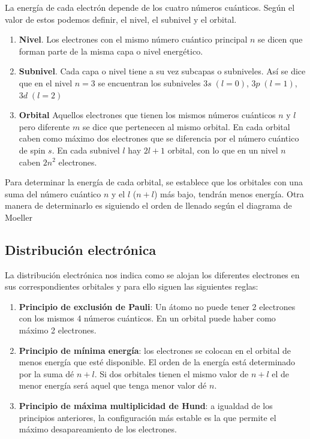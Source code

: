 La energía de cada electrón depende de los cuatro números cuánticos.
Según el valor de estos podemos definir, el nivel, el subnivel y el orbital.
\begin{enumerate}[label=\numberballmDarkTeal]
        \item \textbf{Nivel}.
        Los electrones con el mismo número cuántico principal $n$ se dicen que forman parte de la misma capa o nivel energético.
        \item \textbf{Subnivel}.
        Cada capa o nivel tiene a su vez subcapas o subniveles.
        Así se dice que en el nivel $n=3$ se encuentran los subniveles $3s\;(l=0)$, $3p\;(l=1)$, $3d\;(l=2)$
        \item \textbf{Orbital} Aquellos electrones que tienen los mismos números cuánticos $n$ y $l$ pero diferente $m$ se dice que pertenecen al mismo orbital.
        En cada orbital caben como máximo dos electrones que se diferencia por el número cuántico de spin $s$.
        En cada subnivel $l$ hay $2l+1$ orbital, con lo que en un nivel $n$ caben $2n^2$ electrones.
\end{enumerate}

Para determinar la energía de cada orbital, se establece que los orbitales con una suma del número cuántico \(n\) y el \(l\) (\(n + l\)) más bajo, tendrán menos energía.
Otra manera de determinarlo es siguiendo el orden de llenado según el diagrama de Moeller

\subsection{Distribución electrónica}\label{subsec:distribucion-electronica}

La distribución electrónica nos indica como se alojan los diferentes electrones en sus correspondientes orbitales y para ello siguen las siguientes reglas:

\begin{enumerate}[label=\numberballmDarkTeal]
        \item \textbf{Principio de exclusión de Pauli}: Un átomo no puede tener 2 electrones con los mismos 4 números cuánticos.
        En un orbital puede haber como máximo 2 electrones.
        \item \textbf{Principio de mínima energía}: los electrones se colocan en el orbital de menos energía que esté disponible.
        El orden de la energía está determinado por la suma dé $n + l$.
        Si dos orbitales tienen el mismo valor de $n+l$ el de menor energía será aquel que tenga menor valor dé $n$.

        \item \textbf{Principio de máxima multiplicidad de Hund}: a igualdad de los principios anteriores, la configuración más estable es la que permite el máximo desapareamiento de los electrones.
\end{enumerate}

